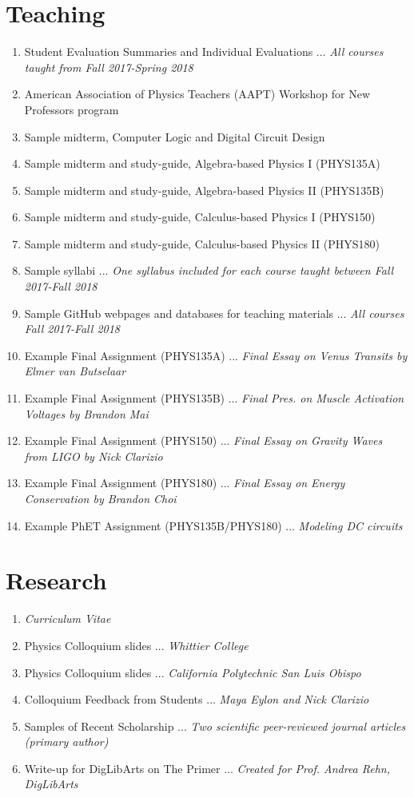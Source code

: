 \documentclass[../../main.tex]{subfiles}
\begin{document}
\section{Teaching}

\begin{enumerate}
\item Student Evaluation Summaries and Individual Evaluations ... \textit{All courses taught from Fall 2017-Spring 2018}
\item American Association of Physics Teachers (AAPT) Workshop for New Professors program
\item Sample midterm, Computer Logic and Digital Circuit Design
\item Sample midterm and study-guide, Algebra-based Physics I (PHYS135A)
\item Sample midterm and study-guide, Algebra-based Physics II (PHYS135B)
\item Sample midterm and study-guide, Calculus-based Physics I (PHYS150)
\item Sample midterm and study-guide, Calculus-based Physics II (PHYS180)
\item Sample syllabi ... \textit{One syllabus included for each course taught between Fall 2017-Fall 2018}
\item Sample GitHub webpages and databases for teaching materials ... \textit{All courses Fall 2017-Fall 2018}
\item Example Final Assignment (PHYS135A) ... \textit{Final Essay on Venus Transits by Elmer van Butselaar}
\item Example Final Assignment (PHYS135B) ... \textit{Final Pres. on Muscle Activation Voltages by Brandon Mai}
\item Example Final Assignment (PHYS150) ... \textit{Final Essay on Gravity Waves from LIGO by Nick Clarizio}
\item Example Final Assignment (PHYS180) ... \textit{Final Essay on Energy Conservation by Brandon Choi}\
\item Example PhET Assignment (PHYS135B/PHYS180) ... \textit{Modeling DC circuits}
\end{enumerate}

\section{Research}

\begin{enumerate}
\item \textit{Curriculum Vitae}
\item Physics Colloquium slides ... \textit{Whittier College}
\item Physics Colloquium slides ... \textit{California Polytechnic San Luis Obispo}
\item Colloquium Feedback from Students ... \textit{Maya Eylon and Nick Clarizio}
\item Samples of Recent Scholarship ... \textit{Two scientific peer-reviewed journal articles (primary author)}
\item Write-up for DigLibArts on The Primer ... \textit{Created for Prof. Andrea Rehn, DigLibArts}
\end{enumerate}
\end{document}
